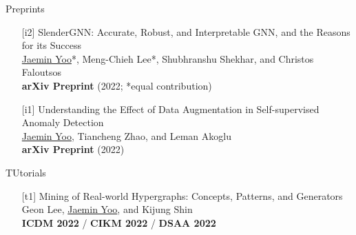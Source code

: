 \documentclass{resume} %
\begin{document}
\begin{rSection}{Preprints}
\smallskip
\begin{enumerate}[leftmargin=*]

	\item[{[i2]}]
		SlenderGNN: Accurate, Robust, and Interpretable GNN, and the Reasons for its Success \\
		\underline{Jaemin Yoo}*, Meng-Chieh Lee*, Shubhranshu Shekhar, and Christos Faloutsos \\
		\textbf{arXiv Preprint} (2022; *equal contribution) \\

	\item[{[i1]}]
		Understanding the Effect of Data Augmentation in Self-supervised Anomaly Detection \\
		\underline{Jaemin Yoo}, Tiancheng Zhao, and Leman Akoglu \\
		\textbf{arXiv Preprint} (2022) \\

\end{enumerate}
\end{rSection}


\begin{rSection}{TUtorials}
\smallskip
\begin{enumerate}[leftmargin=*]

	\item[{[t1]}]
		Mining of Real-world Hypergraphs: Concepts, Patterns, and Generators \\
		Geon Lee, \underline{Jaemin Yoo}, and Kijung Shin \\
		\textbf{ICDM 2022} / \textbf{CIKM 2022} / \textbf{DSAA 2022} \\

\end{enumerate}
\end{rSection}

\end{document}
